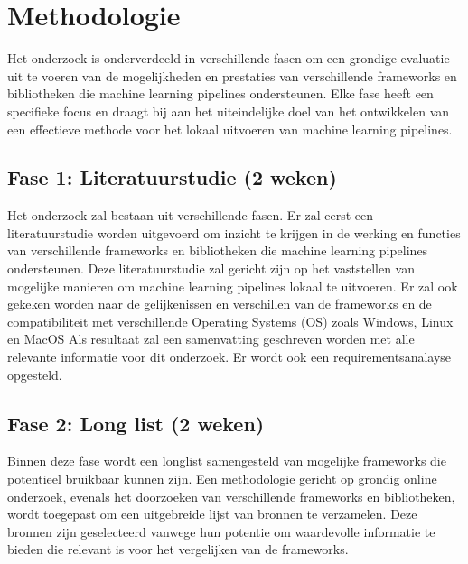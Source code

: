 

\section{Methodologie}%
\label{sec:methodologie}
Het onderzoek is onderverdeeld in verschillende fasen om een grondige evaluatie uit te voeren van de mogelijkheden en prestaties van verschillende frameworks en bibliotheken die machine learning pipelines ondersteunen. Elke fase heeft een specifieke focus en draagt bij aan het uiteindelijke doel van het ontwikkelen van een effectieve methode voor het lokaal uitvoeren van machine learning pipelines.
\subsection{Fase 1: Literatuurstudie (2 weken)}
Het onderzoek zal bestaan uit verschillende fasen. Er zal eerst een literatuurstudie worden uitgevoerd om inzicht te krijgen in de werking en
functies van verschillende frameworks en bibliotheken die machine learning pipelines ondersteunen.
Deze literatuurstudie zal gericht zijn op het vaststellen van mogelijke manieren om machine learning pipelines lokaal te uitvoeren. Er zal ook gekeken worden naar de gelijkenissen en verschillen van de frameworks en de compatibiliteit met verschillende Operating Systems (OS) zoals Windows, Linux en MacOS
Als resultaat zal een samenvatting geschreven worden met alle relevante informatie voor dit onderzoek.
Er wordt ook een requirementsanalayse opgesteld.\\
\subsection{Fase 2: Long list (2 weken)}
Binnen deze fase wordt een longlist samengesteld van mogelijke frameworks die potentieel bruikbaar kunnen zijn. Een methodologie gericht op grondig online onderzoek, evenals het doorzoeken van verschillende frameworks en bibliotheken, wordt toegepast om een uitgebreide lijst van bronnen te verzamelen. Deze bronnen zijn geselecteerd vanwege hun potentie om waardevolle informatie te bieden die relevant is voor het vergelijken van de frameworks.
